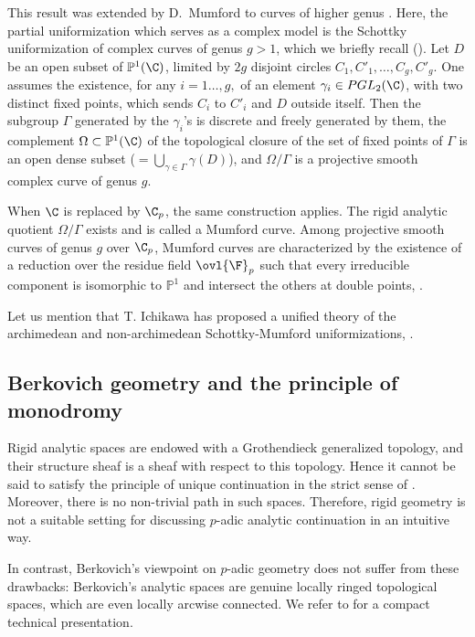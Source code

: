 \begin{para}
 This result was extended by D.~Mumford to
 curves of higher genus \cite{aacodcoclr}.  Here, the
 partial uniformization which serves as a complex model is the 
 Schottky uniformization of complex curves of genus
 $g>1$, which we briefly recall (\cf \cite{osats}).  Let
 $D$ be an open subset of ${\mathbb{P}}^1(\C)$, limited by $2g$ 
 disjoint circles $C_1,C'_1,\ldots,C_g,C'_g$.  One
 assumes the existence, for any $i=1\ldots, g,$ of an element 
 $\gamma_i\in PGL_2(\C)$, with two distinct fixed
 points, which sends $C_i$ to $C'_i$ and $D$ outside itself. Then the 
 subgroup $\Gamma$ generated by the
 $\gamma_i$'s is discrete and freely generated by them, the complement 
 $\Omega\subset {\mathbb{P}}^1(\C)$ of the
 topological closure of the set of fixed points of
 $\Gamma$ is an open dense subset ($=\bigcup_{\gamma \in \Gamma} 
 \gamma(D)$), and $\Omega/\Gamma$ is a projective
 smooth complex curve of genus $g$.

 When $\C$ is replaced by $\C_p$, the same construction applies. The
 rigid analytic quotient $\Omega/\Gamma$ exists and is called a Mumford
 curve. Among projective smooth curves of genus $g$ over $\C_p$, Mumford
 curves are characterized by the existence of a reduction over the
 residue field ${\ovl{\F}}_p$ such that every irreducible component is
 isomorphic to ${\mathbb{P}}^1$ and intersect the others at double
 points, \cf \cite{sgamc}.

 Let us mention that T. Ichikawa has proposed a unified theory of 
 the archimedean and non-archimedean
 Schottky-Mumford uniformizations, \cf \cite{sutorsamcoig}.
\end{para}

\subsection{Berkovich geometry and the principle of monodromy}

\begin{para}
 Rigid analytic spaces are endowed with a 
 Grothendieck generalized topology, and their
 structure sheaf is a sheaf with respect to this topology. Hence
 it cannot be said to satisfy the principle of
 unique continuation in the strict sense of .
 Moreover, there is no non-trivial path in such spaces.  Therefore,
 rigid geometry is not a suitable setting for discussing $p$-adic 
 analytic continuation in an intuitive way.

 In contrast, Berkovich's viewpoint on $p$-adic geometry does 
 not suffer from these drawbacks: Berkovich's
 analytic spaces are genuine locally ringed topological spaces, which 
 are even locally arcwise connected. We refer to
 \cite{spasalc} for a compact technical presentation.
\end{para}


